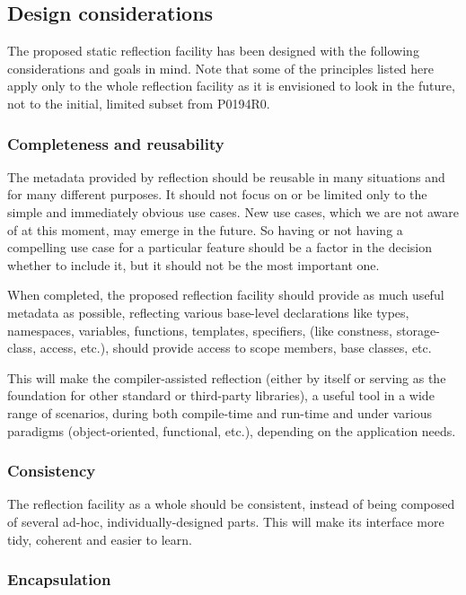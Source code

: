 \subsection{Design considerations}

The proposed static reflection facility has been designed with the following
considerations and goals in mind. 
Note that some of the principles listed here
apply only to the whole reflection facility as it is envisioned
to look in the future, not to the initial, limited subset from P0194R0.

\subsubsection{Completeness and reusability}
\label{design-completeness}

The metadata provided by reflection should be reusable in many situations
and for many different purposes.
It should not focus on or be limited only to the simple and immediately obvious
use cases. New use cases, which we are not aware of at this moment, may emerge
in the future. So having or not having a compelling use case for a particular
feature should be a factor in the decision whether to include it, but it should
not be the most important one.

When completed, the proposed reflection facility should provide as much useful
metadata as possible, reflecting various base-level
declarations like types, namespaces, variables, functions, templates, specifiers,
(like constness, storage-class, access, etc.), should provide access
to scope members, base classes, etc.

This will make the compiler-assisted reflection (either by itself or serving
as the foundation for other standard or third-party libraries), a useful tool
in a wide range of scenarios, during both compile-time
and run-time and under various paradigms (object-oriented, functional, etc.),
depending on the application needs.

\subsubsection{Consistency}
\label{design-consistency}

The reflection facility as a whole should be consistent, instead of being
composed of several ad-hoc, individually-designed parts. This will make
its interface more tidy, coherent and easier to learn.

\subsubsection{Encapsulation}
\label{design-encapsulation}

